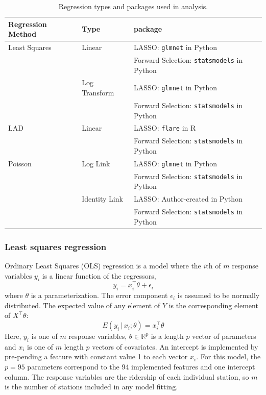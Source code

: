 \documentclass[11pt]{article}
\begin{document}
\begin{table} [H]
\centering
\begin{tabular}{lll}
\toprule Regression Method&Type&package\\
\midrule Least Squares&Linear&LASSO: \texttt{glmnet} in Python\\
&&Forward Selection: \texttt{statsmodels} in Python\\
&Log Transform&LASSO: \texttt{glmnet} in Python\\
&&Forward Selection: \texttt{statsmodels} in Python\\
LAD&Linear&LASSO: \texttt{flare} in R\\
&&Forward Selection: \texttt{statsmodels} in Python\\
Poisson&Log Link&LASSO: \texttt{glmnet} in Python\\
&&Forward Selection: \texttt{statsmodels} in Python\\
&Identity Link&LASSO: Author-created in Python\\
&&Forward Selection: \texttt{statsmodels} in Python\\
\bottomrule
\end{tabular}
\caption{Regression types and packages used in analysis.}
\label{tab:regtype}
\end{table}



\subsubsection{Least squares regression}\label{sec:lstsq}

Ordinary Least Squares (OLS) regression is a model where the $i$th of $m$ response variables $y_i$ is a linear function of the regressors,
\[y_i = x_i^\top\theta + \epsilon_i\] where $\theta$ is a parameterization. The error component $\epsilon_i$ is assumed to be normally distributed. The expected value of any element of $Y$ is the corresponding element of $X^\top\theta$:
\[E(y_i\,|\,x_i; \theta) = x_i^\top\theta\]
Here, $y_i$ is one of $m$ response variables, $\theta\in\mathbb{R}^p$ is a length $p$ vector of parameters and $x_i$ is one of $m$ length $p$ vectors of covariates. An intercept is implemented by pre-pending a feature with constant value 1 to each vector $x_i$. For this model, the $p=95$ parameters correspond to the 94 implemented features and one intercept column. The response variables are the ridership of each individual station, so $m$ is the number of stations included in any model fitting.  
\end{document}
